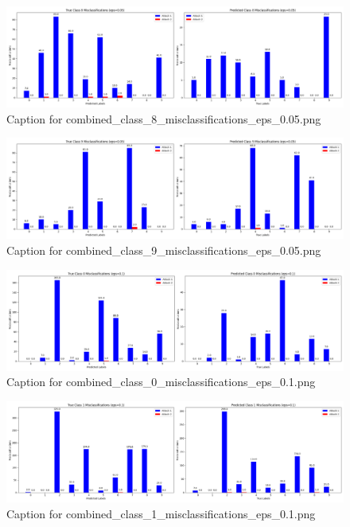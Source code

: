 \documentclass[11pt,onside]{article}
\begin{document}
\begin{figure}[ht]
\centering
\includegraphics[width=1\textwidth]{combined_class_boundary_pgd/combined_class_8_misclassifications_eps_0.05.png}
\caption{Caption for combined_class_8_misclassifications_eps_0.05.png}
\label{fig:combined_class_8_misclassifications_eps_0.05.png}
\end{figure}

\begin{figure}[ht]
\centering
\includegraphics[width=1\textwidth]{combined_class_boundary_pgd/combined_class_9_misclassifications_eps_0.05.png}
\caption{Caption for combined_class_9_misclassifications_eps_0.05.png}
\label{fig:combined_class_9_misclassifications_eps_0.05.png}
\end{figure}

\begin{figure}[ht]
\centering
\includegraphics[width=1\textwidth]{combined_class_boundary_pgd/combined_class_0_misclassifications_eps_0.1.png}
\caption{Caption for combined_class_0_misclassifications_eps_0.1.png}
\label{fig:combined_class_0_misclassifications_eps_0.1.png}
\end{figure}

\begin{figure}[ht]
\centering
\includegraphics[width=1\textwidth]{combined_class_boundary_pgd/combined_class_1_misclassifications_eps_0.1.png}
\caption{Caption for combined_class_1_misclassifications_eps_0.1.png}
\label{fig:combined_class_1_misclassifications_eps_0.1.png}
\end{figure}
\end{document}

